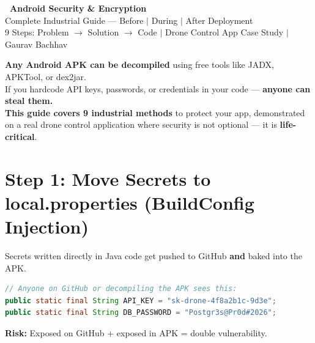 \documentclass[11pt,a4paper]{article}
\newcommand{\danger}[1]{\textcolor{danger}{\textbf{#1}}}
\begin{document}
\begin{center}
{\Huge\bfseries\sffamily\color{primary} ~Android Security \& Encryption}\\[0.4cm]
{\Large\sffamily\color{accent} Complete Industrial Guide --- Before $|$ During $|$ After Deployment}\\[0.3cm]
{\normalsize\color{gray} 9 Steps: Problem $\rightarrow$ Solution $\rightarrow$ Code $|$ Drone Control App Case Study $|$ Gaurav Bachhav}
\end{center}
\vspace{0.3cm}

\begin{summarybox}
\textbf{Any Android APK can be decompiled} using free tools like JADX, APKTool, or dex2jar.\\
If you hardcode API keys, passwords, or credentials in your code --- \danger{anyone can steal them.}\\[6pt]
\textbf{This guide covers 9 industrial methods} to protect your app, demonstrated on a real drone control application where security is not optional --- it is \textbf{life-critical}.
\end{summarybox}

\tableofcontents
\newpage

\section{Step 1: Move Secrets to local.properties (BuildConfig Injection)}

\begin{problembox}
Secrets written directly in Java code get pushed to GitHub \textbf{and} baked into the APK.
\begin{lstlisting}[language=Java]
// Anyone on GitHub or decompiling the APK sees this:
public static final String API_KEY = "sk-drone-4f8a2b1c-9d3e";
public static final String DB_PASSWORD = "Postgr3s@Pr0d#2026";
\end{lstlisting}
\danger{Risk:} Exposed on GitHub + exposed in APK = double vulnerability.
\end{problembox}
\end{document}
